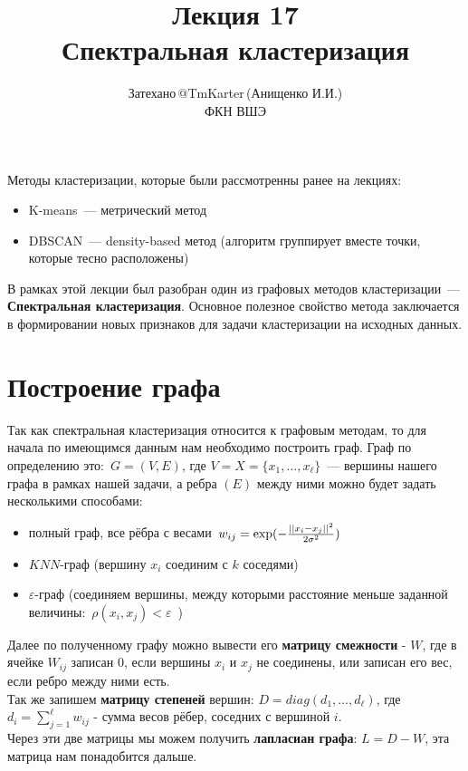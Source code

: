 \documentclass[12pt,fleqn]{article}
\begin{document}
\title{Лекция 17\\Спектральная кластеризация}
\author{Затехано\,@TmKarter\,(Анищенко И.И.)\\ФКН ВШЭ}
\maketitle

Методы кластеризации, которые были рассмотренны ранее на лекциях:

\begin{itemize}
	\item K-means~--- метрический метод
	\item DBSCAN~--- density-based метод (алгоритм группирует вместе точки, которые тесно расположены)
\end{itemize}

В рамках этой лекции был разобран один из графовых методов кластеризации~--- {\bf Спектральная кластеризация}. Основное полезное свойство метода заключается в формировании новых признаков для задачи кластеризации на исходных данных.

\section{Построение графа}
Так как спектральная кластеризация относится к графовым методам, то для начала по имеющимся данным нам необходимо построить граф. Граф по определению это:~$G=(V,E)$, где $V=X=\{x_1,...,x_{\ell}\}$~--- вершины нашего графа в рамках нашей задачи, а ребра $(E)$ между ними можно будет задать несколькими способами:

\begin{itemize}
	\item полный граф, все рёбра с весами~$w_{ij} = \large\exp(-\frac{||x_i - x_j||^2}{2\sigma^2})$~
	\item $KNN$-граф (вершину $x_i$ соединим с $k$ соседями)
	\item $\varepsilon$-граф (соединяем вершины, между которыми расстояние меньше заданной величины:~$\rho(x_i,x_j)<\varepsilon$~)
\end{itemize}

Далее по полученному графу можно вывести его {\bf матрицу смежности} - $W$, где в ячейке $W_{ij}$ записан $0$, если вершины $x_i$ и $x_j$ не соединены, или записан его вес, если ребро между ними есть.\\
Так же запишем {\bf матрицу степеней} вершин: $D=diag(d_1,...,d_{\ell})$, где $d_i = \sum^{\ell}_{j=1}w_{ij}$ - сумма весов рёбер, соседних с вершиной $i$.\\
Через эти две матрицы мы можем получить {\bf лапласиан графа}: $L = D - W$, эта матрица нам понадобится дальше.
\end{document}
